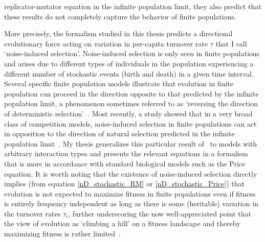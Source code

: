 replicator-mutator equation in the infinite population limit, they also predict that these results do not completely capture the behavior of finite populations.

More precisely, the formalism studied in this thesis predicts a directional evolutionary force acting on variation in per-capita turnover rate $\tau$ that I call `noise-induced selection'. Noise-induced selection is only seen in finite populations and arises due to different types of individuals in the population experiencing a different number of stochastic events (birth and death) in a given time interval. Several specific finite population models illustrate that evolution in finite population can proceed in the direction opposite to that predicted by the infinite population limit, a phenomenon sometimes referred to as `reversing the direction of deterministic selection'~\citep{parsons_consequences_2010, houchmandzadeh_fluctuation_2015, behar_fluctuations-induced_2016, constable_demographic_2016,mcleod_social_2019}. Most recently, a study showed that in a very broad class of competition models, noise-induced selection in finite populations can act in opposition to the direction of natural selection predicted in the infinite population limit~\citep{mazzolini_universality_2022}. My thesis generalizes this particular result of~\cite{mazzolini_universality_2022} to models with arbitrary interaction types and presents the relevant equations in a formalism that is more in accordance with standard biological models such as the Price equation. It is worth noting that the existence of noise-induced selection directly implies (from equation \eqref{nD_stochastic_RM} or \eqref{nD_stochastic_Price}) that evolution is not expected to maximize fitness in finite populations even if fitness is entirely frequency independent as long as there is some (heritable) variation in the turnover rates $\tau_i$, further underscoring the now well-appreciated point that the view of evolution as `climbing a hill' on a fitness landscape and thereby maximizing fitness is rather limited~\citep{grodwohl_theory_2017}.

